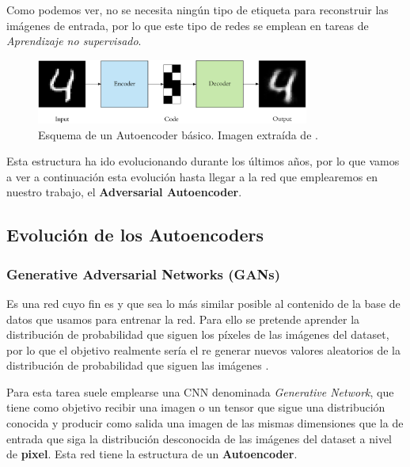         \noindent Como podemos ver, no se necesita ningún tipo de etiqueta para reconstruir las imágenes de entrada, por lo que este tipo de redes se emplean en tareas de \textit{Aprendizaje no supervisado}.

        \begin{figure}[!h]
            \centering
            \includegraphics[width=0.8\textwidth]{img/Autoencoder.png}
            \caption{Esquema de un Autoencoder básico. Imagen extraída de \cite{autoencoders2017}.}
            \label{fig:Autoencoder}
        \end{figure}

        \medskip 

        \noindent Esta estructura ha ido evolucionando durante los últimos años, por lo que vamos a ver a continuación esta evolución hasta llegar a la red que emplearemos en nuestro trabajo, el \textbf{Adversarial Autoencoder}.

    \subsection{Evolución de los Autoencoders}
        \subsubsection{Generative Adversarial Networks (GANs)}
            \noindent Es una red cuyo fin es  y que sea lo más similar posible al contenido de la base de datos que usamos para entrenar la red. Para ello se pretende aprender la distribución de probabilidad que siguen los píxeles de las imágenes del dataset, por lo que el objetivo realmente sería el re generar nuevos valores aleatorios de la distribución de probabilidad que siguen las imágenes \cite{GAN}. 

            \medskip

            \noindent Para esta tarea suele emplearse una CNN denominada \textit{Generative Network}, que tiene como objetivo recibir una imagen o un tensor que sigue una distribución conocida y producir como salida una imagen de las mismas dimensiones que la de entrada que siga la distribución desconocida de las imágenes del dataset a nivel de \textbf{pixel}. Esta red tiene la estructura de un \textbf{Autoencoder}.

